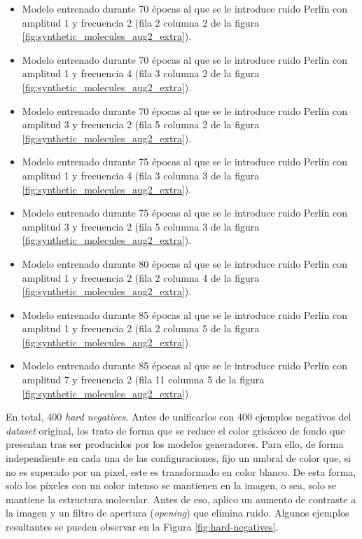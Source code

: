 \begin{itemize}
    \item Modelo entrenado durante 70 épocas al que se le introduce ruido Perlín con amplitud 1 y frecuencia 2 (fila 2 columna 2 de la figura \ref{fig:synthetic_molecules_aug2_extra}).
    \item Modelo entrenado durante 70 épocas al que se le introduce ruido Perlín con amplitud 1 y frecuencia 4 (fila 3 columna 2 de la figura \ref{fig:synthetic_molecules_aug2_extra}).
    \item Modelo entrenado durante 70 épocas al que se le introduce ruido Perlín con amplitud 3 y frecuencia 2 (fila 5 columna 2 de la figura \ref{fig:synthetic_molecules_aug2_extra}).
    \item Modelo entrenado durante 75 épocas al que se le introduce ruido Perlín con amplitud 1 y frecuencia 4 (fila 3 columna 3 de la figura \ref{fig:synthetic_molecules_aug2_extra}).
    \item Modelo entrenado durante 75 épocas al que se le introduce ruido Perlín con amplitud 3 y frecuencia 2 (fila 5 columna 3 de la figura \ref{fig:synthetic_molecules_aug2_extra}).
    \item Modelo entrenado durante 80 épocas al que se le introduce ruido Perlín con amplitud 1 y frecuencia 2 (fila 2 columna 4 de la figura \ref{fig:synthetic_molecules_aug2_extra}).
    \item Modelo entrenado durante 85 épocas al que se le introduce ruido Perlín con amplitud 1 y frecuencia 2 (fila 2 columna 5 de la figura \ref{fig:synthetic_molecules_aug2_extra}).
    \item Modelo entrenado durante 85 épocas al que se le introduce ruido Perlín con amplitud 7 y frecuencia 2 (fila 11 columna 5 de la figura \ref{fig:synthetic_molecules_aug2_extra}).
\end{itemize}

En total, 400 \textit{hard negatives}. Antes de unificarlos con 400 ejemplos negativos del \textit{dataset} original, los trato de forma que se reduce el color grisáceo de fondo que presentan tras ser producidos por los modelos generadores. Para ello, de forma independiente en cada una de las configuraciones, fijo un umbral de color que, si no es superado por un pixel, este es transformado en color blanco. De esta forma, solo los píxeles con un color intenso se mantienen en la imagen, o sea, solo se mantiene la estructura molecular. Antes de eso, aplico un aumento de contraste a la imagen y un filtro de apertura (\textit{opening}) que elimina ruido. Algunos ejemplos resultantes se pueden observar en la Figura \ref{fig:hard-negatives}.

